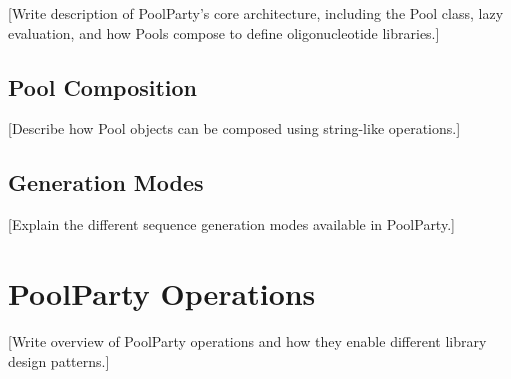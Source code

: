 \documentclass[11pt]{article}
\begin{document}
[Write description of PoolParty's core architecture, including the Pool class,
lazy evaluation, and how Pools compose to define oligonucleotide libraries.]

\subsection{Pool Composition}
\label{subsec:pool-composition}

%

[Describe how Pool objects can be composed using string-like operations.]

\subsection{Generation Modes}
\label{subsec:generation-modes}

%

[Explain the different sequence generation modes available in PoolParty.]



\section{PoolParty Operations}
\label{sec:poolparty-operations}

%

[Write overview of PoolParty operations and how they enable different
library design patterns.]

\end{document}
